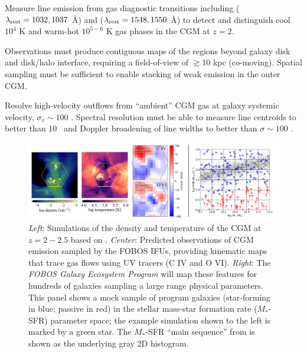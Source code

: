 \documentclass[11pt,a4paper,twoside,onecolumn,openany,final,oldfontcommands]{memoir}
\begin{document}
\medskip
\begin{sciencerequirement}
\reqitem Measure line emission from gas diagnostic transitions including  ($\lambda_{\rm rest} = 1032, 1037$ \AA) and  ($\lambda_{\rm rest} = 1548, 1550$ \AA) to detect and distinguish cool $10^4$ K and warm-hot $10^{5-6}$ K gas phases in the CGM at $z = 2$. 

\reqitem Observations must produce contiguous maps of the regions beyond galaxy disk and disk/halo interface, requiring a field-of-view of $\gtrsim$10 kpc (co-moving).
\reqitem Spatial sampling must be sufficient to enable stacking of weak emission in the outer CGM.

\reqitem Resolve high-velocity outflows from ``ambient'' CGM gas at galaxy systemic velocity, $\sigma_v \sim 100$ \kms.  
\reqitem Spectral resolution must be able to measure line centroids to better than 10 \kms\ and Doppler broadening of line widths to better than $\sigma \sim 100$ \kms. 
\end{sciencerequirement}




\begin{figure}
\includegraphics[width=\textwidth]{figs/msipProposalCgmCombo.pdf} 
\caption[CGM simulation examples and proposed sample]{\textit{Left}: Simulations of the density and temperature of the CGM at $z=2-2.5$ based on \citet{Corlies:2018aa}. \textit{Center}: Predicted observations of CGM emission sampled by the FOBOS IFUs, providing kinematic maps that trace gas flows using UV tracers (C IV and O VI).  \textit{Right}: The \textit{FOBOS Galaxy Ecosystem Program} will map these features for hundreds of galaxies sampling a large range physical parameters.  This panel shows a mock sample of program galaxies (star-forming in blue; passive in red) in the stellar mass-star formation rate ($M_*$-SFR) parameter space; the example simulation shown to the left is marked by a green star. The $M_*$-SFR ``main sequence'' from \citet{Whitaker:2012} is shown as the underlying gray 2D histogram.}
\label{fig:cgmsample}
\end{figure}
\end{document}

